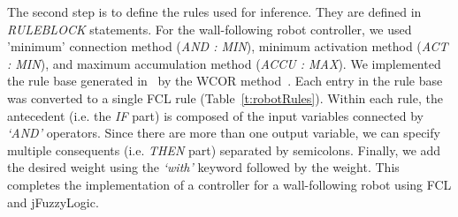 \documentclass[conference]{IEEEtran}
\begin{document}
The second step is to define the rules used for inference. 
They are defined in \textit{RULEBLOCK} statements.
For the wall-following robot controller, we used 'minimum' connection method (\textit{AND : MIN}), minimum activation method (\textit{ACT : MIN}), and maximum accumulation method (\textit{ACCU : MAX}). 
We implemented the rule base generated in~\cite{mucientes2009learning} by the WCOR method~\cite{Alc06}. 
Each entry in the rule base was converted to a single FCL rule (Table~\ref{t:robotRules}).
Within each rule, the antecedent (i.e. the \textit{IF} part) is composed of the input variables connected by \textit{`AND'} operators.
Since there are more than one output variable, we can specify multiple consequents (i.e. \textit{THEN} part) separated by semicolons. 
Finally, we add the desired weight using the \textit{`with'} keyword followed by the weight. 
This completes the implementation of a controller for a wall-following robot using FCL and jFuzzyLogic.
\end{document}
